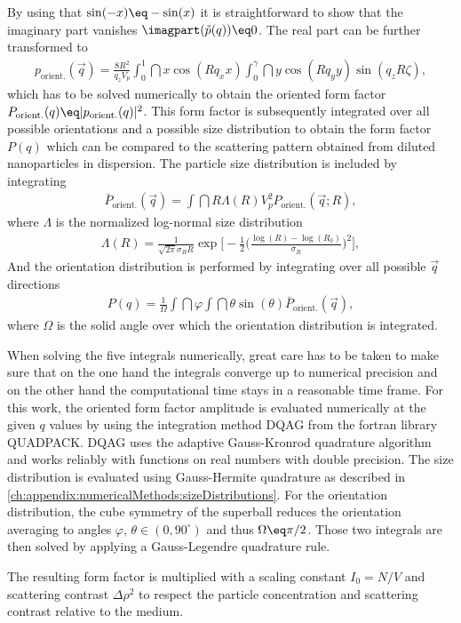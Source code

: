 \documentclass[\main/dresen_thesis.tex]{subfiles}
\begin{document}
    By using that $\sin(-x) \eq - \sin(x)$ it is straightforward to show that the imaginary part vanishes $\imagpart (\tilde{p}(q)) \eq 0$. 
    The real part can be further transformed to
    \begin{align}
      p_\mathrm{orient.}(\vec{q}) = \frac{8R^2}{q_z V_p} \int_{0}^{1} \dint x \cos(R q_x x) \int_{0}^{\gamma} \dint y \cos(R q_y y)  \sin (q_z R \zeta),
    \end{align}
    which has to be solved numerically to obtain the oriented form factor $P_\mathrm{orient.}(q) \eq |p_\mathrm{orient.}(q)|^2$.
    This form factor is subsequently integrated over all possible orientations and a possible size distribution to obtain the form factor $P(q)$ which can be compared to the scattering pattern obtained from diluted nanoparticles in dispersion.
    The particle size distribution is included by integrating
    \begin{align}
      \bar{P}_\mathrm{orient.}(\vec{q}) = \int \dint R \Lambda(R) V_p^2 P_\mathrm{orient.}(\vec{q}; R),
    \end{align}
    where $\Lambda$ is the normalized log-normal size distribution
    \begin{align}
      \Lambda(R) = \frac{1}{\sqrt{2 \pi} \sigma_R R} \exp \Bigg[ - \frac{1}{2} \bigg(\frac{\log(R) - \log(R_0)}{\sigma_R} \bigg)^2 \Bigg],
    \end{align}
    And the orientation distribution is performed by integrating over all possible $\vec{q}$ directions
    \begin{align}
      P(q) = \frac{1}{\Omega}
      \int \dint \varphi \int \dint \theta \sin (\theta) \bar{P}_\mathrm{orient.}(\vec{q}),
      \label{eq:superball_intensity_equation}
    \end{align}
    where $\Omega$ is the solid angle over which the orientation distribution is integrated.

    When solving the five integrals numerically, great care has to be taken to make sure that on the one hand the integrals converge up to numerical precision and on the other hand the computational time stays in a reasonable time frame.
    For this work, the oriented form factor amplitude is evaluated numerically at the given $q$ values by using the integration method DQAG from the fortran library QUADPACK.
    DQAG uses the adaptive Gauss-Kronrod quadrature algorithm and works reliably with functions on real numbers with double precision.
    The size distribution is evaluated using Gauss-Hermite quadrature as described in \ref{ch:appendix:numericalMethods:sizeDistributions}.
    For the orientation distribution, the cube symmetry of the superball reduces the orientation averaging to angles $\varphi,\, \theta \in (0, 90 ^\circ)$ and thus $\Omega \eq \pi / 2$. Those two integrals are then solved by applying a Gauss-Legendre quadrature rule.

    The resulting form factor is multiplied with a scaling constant $I_0=N/V$ and scattering contrast $\Delta \rho^2$ to respect the particle concentration and scattering contrast relative to the medium.
\end{document}
